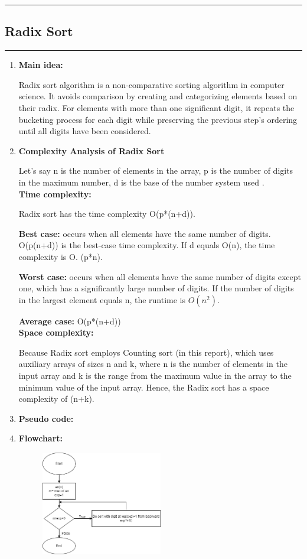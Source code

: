 \documentclass[11pt,a4paper]{article}
\begin{document}
{		\rule{15cm}{0.1cm}
		\subsection{Radix Sort}
		\rule{15cm}{0.1cm}
			\begin{enumerate}[label=\textbf{\arabic*})]
				\item \textbf{Main idea:}
				
					Radix sort algorithm is a non-comparative sorting algorithm in computer science. It avoids comparison by creating and categorizing elements based on their radix. For elements with more than one significant digit, it repeats the bucketing process for each digit while preserving the previous step's ordering until all digits have been considered.
				\\[12pt]
				\item \textbf{Complexity Analysis of Radix Sort}
					
					Let’s say n is the number of elements in the array, p is the number of digits in the maximum number, d is the base of the number system used . 
					\\[9pt]
					\textbf{Time complexity:}
				
				Radix sort has the time complexity O(p*(n+d)).
				
				\textbf{Best case:} occurs when all elements have the same number of digits. O(p(n+d)) is the best-case time complexity. If d equals O(n), the time complexity is O. (p*n).
				
				\textbf{Worst case:} occurs when all elements have the same number of digits except one, which has a significantly large number of digits. If the number of digits in the largest element equals n, the runtime is $O(n^2)$.
				
				\textbf{Average case:} O(p*(n+d))
				\\[9pt]
					\textbf{Space complexity:}
				
				Because Radix sort employs Counting sort (in this report), which uses auxiliary arrays of sizes n and k, where n is the number of elements in the input array and k is the range from the maximum value in the array to the minimum value of the input array. Hence, the Radix sort has a space complexity of (n+k).
				\\[12pt]
				\item \textbf{Pseudo code:} 
				\pagebreak
				\item \textbf{Flowchart:}
					\begin{figure}[H]
						\centering 
						\includegraphics[width=0.5\textwidth]{RadixSort Flowchart}
					\end{figure}
					

\end{enumerate}}
\end{document}
